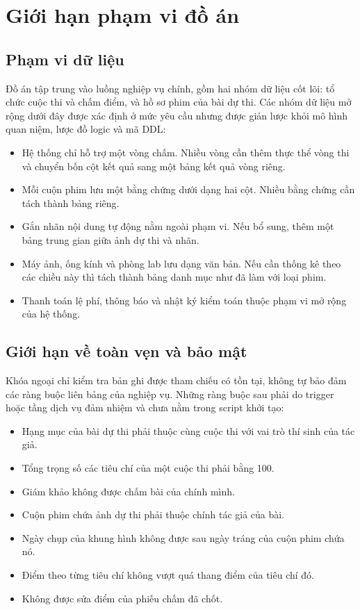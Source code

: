 \section{Giới hạn phạm vi đồ án}

\subsection{Phạm vi dữ liệu}

Đồ án tập trung vào luồng nghiệp vụ chính, gồm hai nhóm dữ liệu cốt lõi: tổ chức cuộc thi và chấm điểm, và hồ sơ phim của bài dự thi. Các nhóm dữ liệu mở rộng dưới đây được xác định ở mức yêu cầu nhưng được giản lược khỏi mô hình quan niệm, lược đồ logic và mã DDL:


\begin{itemize}
    \item Hệ thống chỉ hỗ trợ một vòng chấm. Nhiều vòng cần thêm thực thể vòng thi và chuyển bốn cột kết quả sang một bảng kết quả vòng riêng.
    \item Mỗi cuộn phim lưu một bằng chứng dưới dạng hai cột. Nhiều bằng chứng cần tách thành bảng riêng.
    \item Gắn nhãn nội dung tự động nằm ngoài phạm vi. Nếu bổ sung, thêm một bảng trung gian giữa ảnh dự thi và nhãn.
    \item Máy ảnh, ống kính và phòng lab lưu dạng văn bản. Nếu cần thống kê theo các chiều này thì tách thành bảng danh mục như đã làm với loại phim.
    \item Thanh toán lệ phí, thông báo và nhật ký kiểm toán thuộc phạm vi mở rộng của hệ thống.
\end{itemize}


\subsection{Giới hạn về toàn vẹn và bảo mật}

Khóa ngoại chỉ kiểm tra bản ghi được tham chiếu có tồn tại, không tự bảo đảm các ràng buộc liên bảng của nghiệp vụ. Những ràng buộc sau phải do trigger hoặc tầng dịch vụ đảm nhiệm và chưa nằm trong script khởi tạo:


\begin{itemize}
    \item Hạng mục của bài dự thi phải thuộc cùng cuộc thi với vai trò thí sinh của tác giả.
    \item Tổng trọng số các tiêu chí của một cuộc thi phải bằng 100.
    \item Giám khảo không được chấm bài của chính mình.
    \item Cuộn phim chứa ảnh dự thi phải thuộc chính tác giả của bài.
    \item Ngày chụp của khung hình không được sau ngày tráng của cuộn phim chứa nó.
    \item Điểm theo từng tiêu chí không vượt quá thang điểm của tiêu chí đó.
    \item Không được sửa điểm của phiếu chấm đã chốt.
\end{itemize}



